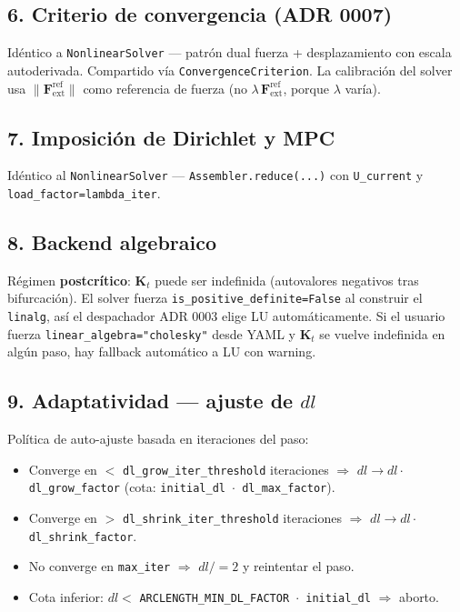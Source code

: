 \documentclass[11pt,letterpaper,oneside]{report}
\begin{document}
\subsection{6. Criterio de convergencia (ADR 0007)}

Idéntico a \texttt{NonlinearSolver} --- patrón dual fuerza + desplazamiento con escala autoderivada. Compartido vía \texttt{ConvergenceCriterion}. La calibración del solver usa $\lVert\mathbf F_{\text{ext}}^{\text{ref}}\rVert$ como referencia de fuerza (no $\lambda\,\mathbf F_{\text{ext}}^{\text{ref}}$, porque $\lambda$ varía).

\subsection{7. Imposición de Dirichlet y MPC}

Idéntico al \texttt{NonlinearSolver} --- \texttt{Assembler.reduce(...)} con \texttt{U\_current} y \texttt{load\_factor=lambda\_iter}.

\subsection{8. Backend algebraico}

Régimen \textbf{postcrítico}: $\mathbf K_t$ puede ser indefinida (autovalores negativos tras bifurcación). El solver fuerza \texttt{is\_positive\_definite=False} al construir el \texttt{linalg}, así el despachador ADR 0003 elige LU automáticamente. Si el usuario fuerza \texttt{linear\_algebra="cholesky"} desde YAML y $\mathbf K_t$ se vuelve indefinida en algún paso, hay fallback automático a LU con warning.

\subsection{9. Adaptatividad --- ajuste de $dl$}

Política de auto-ajuste basada en iteraciones del paso:

\begin{itemize}
  \item Converge en $<$ \texttt{dl\_grow\_iter\_threshold} iteraciones \ensuremath{\Rightarrow} $dl \to dl \cdot $ \texttt{dl\_grow\_factor} (cota: \texttt{initial\_dl \ensuremath{\cdot} dl\_max\_factor}).
  \item Converge en $>$ \texttt{dl\_shrink\_iter\_threshold} iteraciones \ensuremath{\Rightarrow} $dl \to dl \cdot $ \texttt{dl\_shrink\_factor}.
  \item No converge en \texttt{max\_iter} \ensuremath{\Rightarrow} $dl /= 2$ y reintentar el paso.
  \item Cota inferior: $dl < $ \texttt{ARCLENGTH\_MIN\_DL\_FACTOR \ensuremath{\cdot} initial\_dl} \ensuremath{\Rightarrow} aborto.
\end{itemize}
\end{document}
